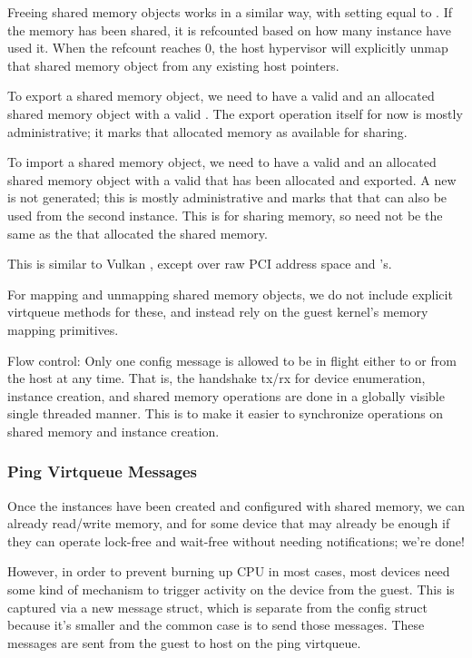 Freeing shared memory objects works in a similar way,
with setting  equal to .
If the memory has been shared,
it is refcounted based on how many instance have used it.
When the refcount reaches 0,
the host hypervisor will explicitly unmap that shared memory object
from any existing host pointers.

To export a shared memory object, we need to have a valid 
and an allocated shared memory object with a valid .
The export operation itself for now is mostly administrative;
it marks that allocated memory as available for sharing.

To import a shared memory object, we need to have a valid 
and an allocated shared memory object with a valid 
that has been allocated and exported. A new  is not generated;
this is mostly administrative and marks that that 
can also be used from the second instance.
This is for sharing memory, so  need not
be the same as the  that allocated the shared memory.

This is similar to Vulkan ,
except over raw PCI address space and 's.

For mapping and unmapping shared memory objects,
we do not include explicit virtqueue methods for these,
and instead rely on the guest kernel's memory mapping primitives.

Flow control: Only one config message is allowed to be in flight
either to or from the host at any time.
That is, the handshake tx/rx for device enumeration, instance creation, and shared memory operations
are done in a globally visible single threaded manner.
This is to make it easier to synchronize operations on shared memory and instance creation.

\subsubsection{Ping Virtqueue Messages}\label{sec:Device Types / User Device / Device Operation / Ping Virtqueue Messages}

Once the instances have been created and configured with shared memory,
we can already read/write memory, and for some device that may already be enough
if they can operate lock-free and wait-free without needing notifications; we're done!

However, in order to prevent burning up CPU in most cases,
most devices need some kind of mechanism to trigger activity on the device
from the guest. This is captured via a new message struct,
which is separate from the config struct because it's smaller and
the common case is to send those messages.
These messages are sent from the guest to host
on the ping virtqueue.

